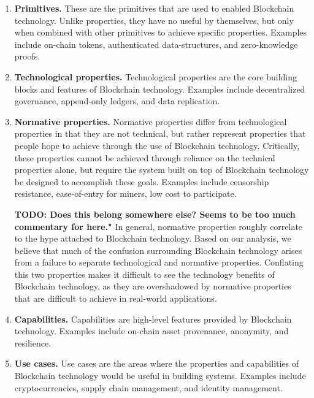 \begin{enumerate}
	\item \textbf{Primitives.} These are the primitives that are used to enabled Blockchain technology. Unlike properties, they have no useful by themselves, but only when combined with other primitives to achieve specific properties. Examples include on-chain tokens, authenticated data-structures, and zero-knowledge proofs.
	
	\item \textbf{Technological properties.} Technological properties are the core building blocks and features of Blockchain technology. Examples include decentralized governance, append-only ledgers, and data replication.
	
	\item \textbf{Normative properties.} Normative properties differ from technological properties in that they are not technical, but rather represent properties that people hope to achieve through the use of Blockchain technology. Critically, these properties cannot be achieved through reliance on the technical properties alone, but require the system built on top of Blockchain technology be designed to accomplish these goals. Examples include censorship resistance, ease-of-entry for miners, low cost to participate.
	
	\hspace{1em}\textbf{TODO: Does this belong somewhere else? Seems to be too much commentary for here."}
	In general, normative properties roughly correlate to the hype attached to Blockchain technology.
	Based on our analysis, we believe that much of the confusion surrounding Blockchain technology arises from a failure to separate technological and normative properties. Conflating this two properties makes it difficult to see the technology benefits of Blockchain technology, as they are overshadowed by normative properties that are difficult to achieve in real-world applications.
	
	\item \textbf{Capabilities.} Capabilities are high-level features provided by Blockchain technology. Examples include on-chain asset provenance, anonymity, and resilience.
	
	\item \textbf{Use cases.} Use cases are the areas where the properties and capabilities of Blockchain technology would be useful in building systems. Examples include cryptocurrencies, supply chain management, and identity management.
\end{enumerate}

